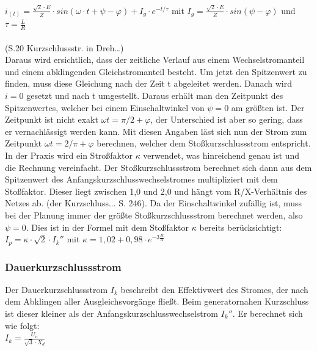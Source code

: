 \documentclass{scrartcl}
\begin{document}
\begin{onehalfspace}
$i_{(t)} = \frac{\sqrt{2} \cdot E}{Z} \cdot sin(\omega \cdot t + \psi - \varphi) + I_g \cdot e^{-t/\tau}$ 
mit $I_g = \frac{\sqrt{2} \cdot E}{Z} \cdot sin( \psi -  \varphi)$ und $\tau = \frac{L}{R}$ \\ \\
(S.20 Kurzschlussstr. in Dreh…)\\
Daraus wird ersichtlich, dass der zeitliche Verlauf aus einem Wechselstromanteil und einem abklingenden Gleichstromanteil besteht. Um jetzt den Spitzenwert zu finden, muss diese Gleichung nach der Zeit t abgeleitet werden. Danach wird $i = 0$ gesetzt und nach t umgestellt. Daraus erhält man den Zeitpunkt des Spitzenwertes, welcher bei einem Einschaltwinkel von $\psi = 0$ am größten ist. Der Zeitpunkt ist nicht exakt $\omega t = \pi/2 + \varphi$, der Unterschied ist aber so gering, dass er vernachlässigt werden kann. Mit diesen Angaben läst sich nun der Strom zum Zeitpunkt $\omega t = 2/\pi + \varphi$ berechnen, welcher dem Stoßkurzschlussstrom entspricht.\\
In der Praxis wird ein Stroßfaktor $\kappa$ verwendet, was hinreichend genau ist und die Rechnung vereinfacht.
Der Stoßkurzschlussstrom berechnet sich dann aus dem Spitzenwert des Anfangskurzschlusswechselstromes multipliziert mit dem Stoßfaktor. Dieser liegt zwischen 1,0 und 2,0 und hängt vom R/X-Verhältnis des Netzes ab. (der Kurzschluss... S. 246).
 Da der Einschaltwinkel zufällig ist, muss bei der Planung immer der größte Stoßkurzschlussstrom berechnet werden, also $\psi = 0$. Dies ist in der Formel mit dem Stoßfaktor $\kappa$ bereits berücksichtigt: \\
 
 $I_p = \kappa \cdot \sqrt{2} \cdot I_k''$ mit $\kappa = 1,02 + 0,98 \cdot e^{-3 \frac{R}{X}}$

\subsubsection{Dauerkurzschlussstrom}
Der Dauerkurzschlussstrom $I_k$ beschreibt den Effektivwert des Stromes, der nach dem Abklingen aller Ausgleichsvorgänge fließt. Beim generatornahen Kurzschluss ist dieser kleiner als der Anfangskurzschlusswechselstrom $I_k''$. Er berechnet sich wie folgt: \\

$I_k = \frac{U_n}{\sqrt{3} \cdot X_d}$ \\


\end{onehalfspace}
\end{document}
